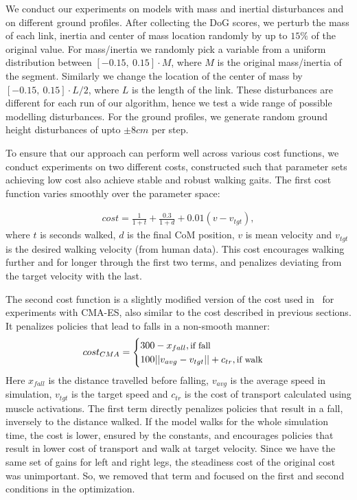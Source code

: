We conduct our experiments on models with mass and inertial disturbances and on different ground profiles. After collecting the DoG scores, we perturb the mass of each link, inertia and center of mass location randomly by up to $15\%$ of the original value. For mass/inertia we randomly pick a variable from a uniform distribution between $[-0.15,\ 0.15] \cdot M$, where $M$ is the original mass/inertia of the segment. Similarly we change the location of the center of mass by $[-0.15,\ 0.15] \cdot L/2$, where $L$ is the length of the link. These disturbances are different for each run of our algorithm, hence we test a wide range of possible modelling disturbances.
For the ground profiles, we generate random ground height disturbances of upto $\pm 8cm$ per step.

To ensure that our approach can perform well across various cost functions, we conduct experiments on two different costs, constructed such that parameter sets achieving low cost also achieve stable and robust walking gaits. The first cost function varies smoothly over the parameter space:
 
\begin{align}
cost = \frac{1}{1+t} + \frac{0.3}{1+d} + 0.01 (v-v_{tgt}),
\end{align}
where $t$ is seconds walked, $d$ is the final CoM position, $v$ is mean velocity and $v_{tgt}$ is the desired walking velocity (from human data). This cost encourages walking further and for longer through the first two terms, and penalizes deviating from the target velocity with the last.

The second cost function is a slightly modified version of the cost used in~\cite{song2015neural} for experiments with \mbox{CMA-ES}, also similar to the cost described in previous sections. It penalizes policies that lead to falls in a non-smooth manner:
\begin{align}
cost_{CMA} = 		
    \begin{cases}
		300 - x_{fall} , \text{\small{if fall}} \\
		100 ||v_{avg} - v_{tgt}|| + c_{tr}, \text{\small{if walk}}\\
	\end{cases}
\end{align}
Here $x_{fall}$ is the distance travelled before falling, $v_{avg}$ is the average speed in simulation, $v_{tgt}$ is the target speed and $c_{tr}$ is the cost of transport calculated using muscle activations. The first term directly penalizes policies that result in a fall, inversely to the distance walked. If the model walks for the whole simulation time, the cost is lower, ensured by the constants, and encourages policies that result in lower cost of transport and walk at target velocity. Since we have the same set of gains for left and right legs, the steadiness cost of the original cost~\cite{song2015neural} was unimportant. So, we removed that term and focused on the first and second conditions in the optimization.

